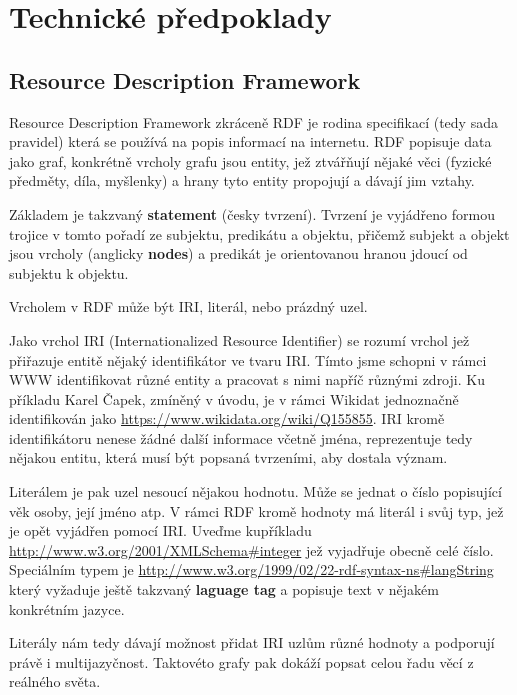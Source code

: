 \chapter{Technické předpoklady}

\section{Resource Description Framework}
Resource Description Framework zkráceně RDF je rodina specifikací (tedy sada pravidel) která se používá na popis informací na internetu. RDF popisuje data jako graf, konkrétně vrcholy grafu jsou entity, jež ztvářňují nějaké věci (fyzické předměty, díla, myšlenky) a hrany tyto entity propojují a dávají jim vztahy.

Základem je takzvaný \textbf{statement} (česky tvrzení). Tvrzení je vyjádřeno formou trojice v tomto pořadí ze subjektu, predikátu a objektu, přičemž subjekt a objekt jsou vrcholy (anglicky \textbf{nodes}) a predikát je orientovanou hranou jdoucí od subjektu k objektu.

Vrcholem v RDF může být IRI, literál, nebo prázdný uzel.

\medskip

Jako vrchol IRI (Internationalized Resource Identifier) se rozumí vrchol jež přiřazuje entitě nějaký identifikátor ve tvaru IRI. Tímto jsme schopni v rámci WWW identifikovat různé entity a pracovat s nimi napříč různými zdroji. Ku příkladu Karel Čapek, zmíněný v úvodu, je v rámci Wikidat jednoznačně identifikován jako \url{https://www.wikidata.org/wiki/Q155855}. IRI kromě identifikátoru nenese žádné další informace včetně jména, reprezentuje tedy nějakou entitu, která musí být popsaná tvrzeními, aby dostala význam.

\medskip

Literálem je pak uzel nesoucí nějakou hodnotu. Může se jednat o číslo popisující věk osoby, její jméno atp. V rámci RDF kromě hodnoty má literál i svůj typ, jež je opět vyjádřen pomocí IRI. Uveďme kupříkladu \url{http://www.w3.org/2001/XMLSchema#integer} jež vyjadřuje obecně celé číslo. Speciálním typem je \url{http://www.w3.org/1999/02/22-rdf-syntax-ns#langString} který vyžaduje ještě takzvaný \textbf{laguage tag} a popisuje text v nějakém konkrétním jazyce.

\medskip

Literály nám tedy dávají možnost přidat IRI uzlům různé hodnoty a podporují právě i multijazyčnost. Taktovéto grafy pak dokáží popsat celou řadu věcí z reálného světa.

